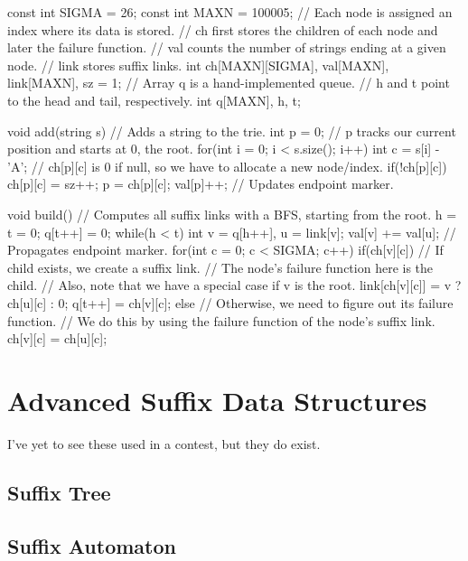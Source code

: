 \begin{mylstlisting}[language=C++]
const int SIGMA = 26;
const int MAXN = 100005;
// Each node is assigned an index where its data is stored.
// ch first stores the children of each node and later the failure function.
// val counts the number of strings ending at a given node.
// link stores suffix links.
int ch[MAXN][SIGMA], val[MAXN], link[MAXN], sz = 1;
// Array q is a hand-implemented queue.
// h and t point to the head and tail, respectively.
int q[MAXN], h, t;

void add(string s){
  // Adds a string to the trie.
  int p = 0; // p tracks our current position and starts at 0, the root.
  for(int i = 0; i < s.size(); i++){
    int c = s[i] - 'A';
    // ch[p][c] is 0 if null, so we have to allocate a new node/index.
    if(!ch[p][c]) ch[p][c] = sz++;
    p = ch[p][c];
  }
  val[p]++; // Updates endpoint marker.
}

void build(){
  // Computes all suffix links with a BFS, starting from the root.
  h = t = 0;
  q[t++] = 0;
  while(h < t){
    int v = q[h++], u = link[v];
    val[v] += val[u]; // Propagates endpoint marker.
    for(int c = 0; c < SIGMA; c++){
      if(ch[v][c]){
        // If child exists, we create a suffix link. 
        // The node's failure function here is the child.
        // Also, note that we have a special case if v is the root.
        link[ch[v][c]] = v ? ch[u][c] : 0;
        q[t++] = ch[v][c];
      } else {
        // Otherwise, we need to figure out its failure function.
        // We do this by using the failure function of the node's suffix link.
        ch[v][c] = ch[u][c];
      }
    }
  }
}
\end{mylstlisting}

\section{Advanced Suffix Data Structures}

I've yet to see these used in a contest, but they do exist. 

\subsection{Suffix Tree}

\subsection{Suffix Automaton}


